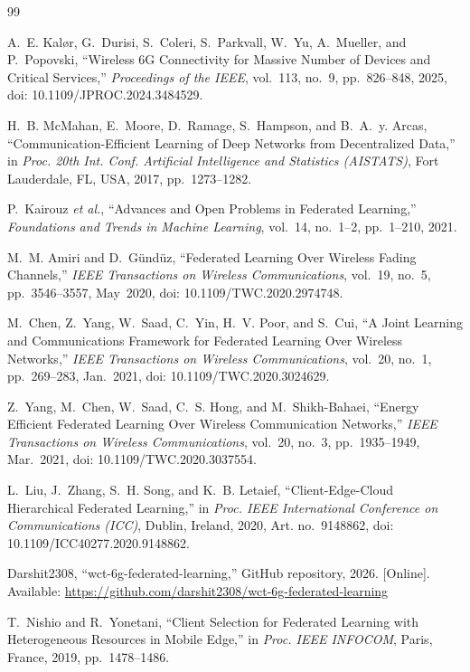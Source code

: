 \documentclass[conference]{IEEEtran}
\begin{document}
\begin{thebibliography}{99}

A.~E. Kal{\o}r, G.~Durisi, S.~Coleri, S.~Parkvall, W.~Yu, A.~Mueller, and P.~Popovski,
``Wireless 6G Connectivity for Massive Number of Devices and Critical Services,''
\emph{Proceedings of the IEEE}, vol.~113, no.~9, pp.~826--848, 2025, doi: 10.1109/JPROC.2024.3484529.

H.~B. McMahan, E.~Moore, D.~Ramage, S.~Hampson, and B.~A.~y. Arcas,
``Communication-Efficient Learning of Deep Networks from Decentralized Data,''
in \emph{Proc. 20th Int. Conf. Artificial Intelligence and Statistics (AISTATS)}, Fort Lauderdale, FL, USA, 2017, pp.~1273--1282.

P.~Kairouz \emph{et al.},
``Advances and Open Problems in Federated Learning,''
\emph{Foundations and Trends in Machine Learning}, vol.~14, no.~1--2, pp.~1--210, 2021.

M.~M. Amiri and D.~G{\"u}nd{\"u}z,
``Federated Learning Over Wireless Fading Channels,''
\emph{IEEE Transactions on Wireless Communications}, vol.~19, no.~5, pp.~3546--3557, May~2020, doi: 10.1109/TWC.2020.2974748.

M.~Chen, Z.~Yang, W.~Saad, C.~Yin, H.~V. Poor, and S.~Cui,
``A Joint Learning and Communications Framework for Federated Learning Over Wireless Networks,''
\emph{IEEE Transactions on Wireless Communications}, vol.~20, no.~1, pp.~269--283, Jan.~2021, doi: 10.1109/TWC.2020.3024629.

Z.~Yang, M.~Chen, W.~Saad, C.~S. Hong, and M.~Shikh-Bahaei,
``Energy Efficient Federated Learning Over Wireless Communication Networks,''
\emph{IEEE Transactions on Wireless Communications}, vol.~20, no.~3, pp.~1935--1949, Mar.~2021, doi: 10.1109/TWC.2020.3037554.

L.~Liu, J.~Zhang, S.~H. Song, and K.~B. Letaief,
``Client-Edge-Cloud Hierarchical Federated Learning,''
in \emph{Proc. IEEE International Conference on Communications (ICC)}, Dublin, Ireland, 2020, Art. no.~9148862, doi: 10.1109/ICC40277.2020.9148862.

Darshit2308,
``wct-6g-federated-learning,''
GitHub repository, 2026. [Online]. Available: \url{https://github.com/darshit2308/wct-6g-federated-learning}

T.~Nishio and R.~Yonetani,
``Client Selection for Federated Learning with Heterogeneous Resources in Mobile Edge,''
in \emph{Proc. IEEE INFOCOM}, Paris, France, 2019, pp.~1478--1486.


\end{thebibliography}
\end{document}
